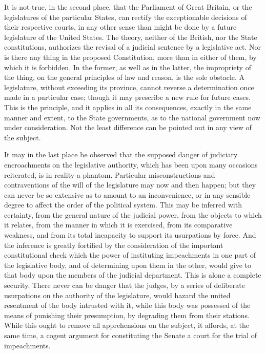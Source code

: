 It is not true, in the second place, that the Parliament of Great Britain, or the legislatures of the particular States, can rectify the exceptionable decisions of their respective courts, in any other sense than might be done by a future legislature of the United States. The theory, neither of the British, nor the State constitutions, authorizes the revisal of a judicial sentence by a legislative act. Nor is there any thing in the proposed Constitution, more than in either of them, by which it is forbidden. In the former, as well as in the latter, the impropriety of the thing, on the general principles of law and reason, is the sole obstacle. A legislature, without exceeding its province, cannot reverse a determination once made in a particular case; though it may prescribe a new rule for future cases. This is the principle, and it applies in all its consequences, exactly in the same manner and extent, to the State governments, as to the national government now under consideration. Not the least difference can be pointed out in any view of the subject.

It may in the last place be observed that the supposed danger of judiciary encroachments on the legislative authority, which has been upon many occasions reiterated, is in reality a phantom. Particular misconstructions and contraventions of the will of the legislature may now and then happen; but they can never be so extensive as to amount to an inconvenience, or in any sensible degree to affect the order of the political system. This may be inferred with certainty, from the general nature of the judicial power, from the objects to which it relates, from the manner in which it is exercised, from its comparative weakness, and from its total incapacity to support its usurpations by force. And the inference is greatly fortified by the consideration of the important constitutional check which the power of instituting impeachments in one part of the legislative body, and of determining upon them in the other, would give to that body upon the members of the judicial department. This is alone a complete security. There never can be danger that the judges, by a series of deliberate usurpations on the authority of the legislature, would hazard the united resentment of the body intrusted with it, while this body was possessed of the means of punishing their presumption, by degrading them from their stations. While this ought to remove all apprehensions on the subject, it affords, at the same time, a cogent argument for constituting the Senate a court for the trial of impeachments.

